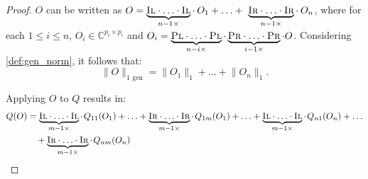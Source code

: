 \begin{proof}
  $O$ can be written as  $O = \underbrace{\textsc{Il} \cdot \ldots \cdot \textsc{Il}}_{n-1 \times} \cdot \hspace{2pt} O_{1} + \ldots +  \underbrace{\textsc{Ir} \cdot \ldots \cdot \textsc{Ir}}_{n-1 \times} \cdot \hspace{2pt} O_{n} 
$, where for each $1 \leq i \leq n$, $O_{i} \in \mathbb{C}^{p_i \times p_i}$ and $O_i =  \underbrace{\textsc{Pl} \cdot \ldots \cdot \textsc{Pl}}_{n-i \times} \cdot \underbrace{\textsc{Pr} \cdot \ldots \cdot \textsc{Pr}}_{i-1 \times} \cdot O $. Considering \autoref{def:gen_norm}, it follows that: 
\begin{equation}
  \lVert O  \rVert_{1 \text{ gen}} = \lVert O_1 \rVert_{1} + \ldots + \lVert O_n \rVert_{1}.
\end{equation}

Applying $O$ to $Q$ results in:
\begin{equation}
\begin{split}
Q(O) & = \underbrace{\textsc{Il} \cdot \ldots \cdot \textsc{Il}}_{m-1 \times} \cdot \hspace{1pt} Q_{11}  (O_{1}) + \ldots +   \underbrace{\textsc{Ir} \cdot \ldots \cdot \textsc{Ir}}_{m-1 \times}\cdot \hspace{1pt} Q_{1m} (O_{1}) + \ldots +  \underbrace{\textsc{Il} \cdot \ldots \cdot \textsc{Il}}_{m-1 \times} \cdot\hspace{1pt} Q_{n1} (O_{n}) +  \ldots \\
& \hspace{10pt}  + \underbrace{\textsc{Ir} \cdot \ldots \cdot \textsc{Ir}}_{m-1 \times}\cdot \hspace{1pt} Q_{nm}  (O_{n})
\end{split}
\end{equation}


\end{proof}
